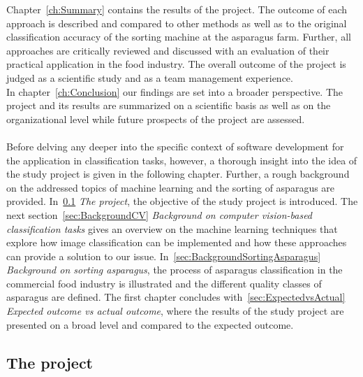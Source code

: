 Chapter~\ref{ch:Summary} contains the results of the project. The outcome of each approach is described and compared to other methods as well as to the original classification accuracy of the sorting machine at the asparagus farm. Further, all approaches are critically reviewed and discussed with an evaluation of their practical application in the food industry. The overall outcome of the project is judged as a scientific study and as a team management experience. \\
In chapter~\ref{ch:Conclusion} our findings are set into a broader perspective. The project and its results are summarized on a scientific basis as well as on the organizational level while future prospects of the project are assessed. \\
\\
Before delving any deeper into the specific context of software development for the application in classification tasks, however, a thorough insight into the idea of the study project is given in the following chapter. Further, a rough background on the addressed topics of machine learning and the sorting of asparagus are provided.
In~\ref{sec:Project} \textit{The project}, the objective of the study project is introduced. The next section~\ref{sec:BackgroundCV} \textit{Background on computer vision-based classification tasks} gives an overview on the machine learning techniques that explore how image classification can be implemented and how these approaches can provide a solution to our issue. In~\ref{sec:BackgroundSortingAsparagus} \textit{Background on sorting asparagus}, the process of asparagus classification in the commercial food industry is illustrated and the different quality classes of asparagus are defined. The first chapter concludes with~\ref{sec:ExpectedvsActual} \textit{Expected outcome vs actual outcome}, where the results of the study project are presented on a broad level and compared to the expected outcome.



\subsection{The project}
\label{sec:Project}

